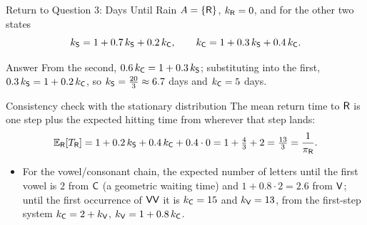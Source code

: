 \begin{frame}{Return to Question 3: Days Until Rain}
  \label{fr:q3}
  \small
  $A=\{\mathsf{R}\}$, $k_{\mathsf{R}}=0$, and for the other two states
  \[
    k_{\mathsf{S}}=1+0.7\,k_{\mathsf{S}}+0.2\,k_{\mathsf{C}},\qquad k_{\mathsf{C}}=1+0.3\,k_{\mathsf{S}}+0.4\,k_{\mathsf{C}}.
  \]
  \begin{exampleblock}{Answer}
    From the second, $0.6\,k_{\mathsf{C}}=1+0.3\,k_{\mathsf{S}}$; substituting into the first, $0.3\,k_{\mathsf{S}}=1+0.2\,k_{\mathsf{C}}$, so $k_{\mathsf{S}}=\tfrac{20}3\approx6.7$ days and $k_{\mathsf{C}}=5$ days.
  \end{exampleblock}
  \begin{block}{Consistency check with the stationary distribution}
    The mean return time to $\mathsf{R}$ is one step plus the expected hitting time from wherever that step lands:
    \[
      \mathbb{E}_{\mathsf{R}}[T_{\mathsf{R}}]=1+0.2\,k_{\mathsf{S}}+0.4\,k_{\mathsf{C}}+0.4\cdot0=1+\tfrac43+2=\tfrac{13}3=\frac1{\pi_{\mathsf{R}}} .
    \]
  \end{block}
  \begin{itemize}
    \item For the vowel/consonant chain, the expected number of letters until the first vowel is $2$ from $\mathsf{C}$ (a geometric waiting time) and $1+0.8\cdot2=2.6$ from $\mathsf{V}$; until the first occurrence of $\mathsf{VV}$ it is $k_{\mathsf{C}}=15$ and $k_{\mathsf{V}}=13$, from the first-step system $k_{\mathsf{C}}=2+k_{\mathsf{V}}$, $k_{\mathsf{V}}=1+0.8\,k_{\mathsf{C}}$.
  \end{itemize}
\end{frame}


